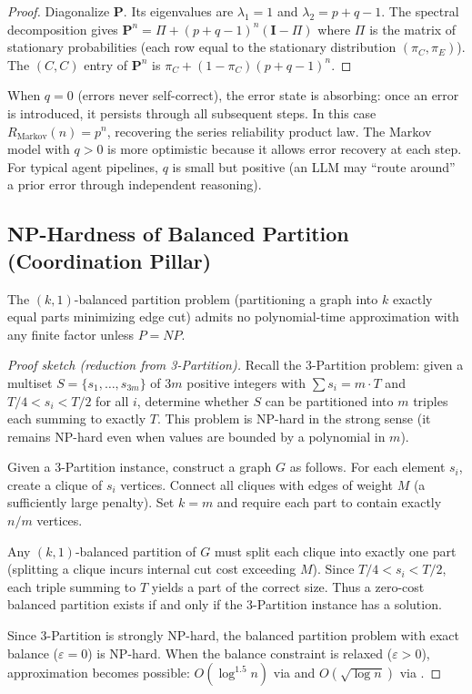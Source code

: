 \begin{proof}
Diagonalize $\mathbf{P}$. Its eigenvalues are $\lambda_1 = 1$ and
$\lambda_2 = p + q - 1$. The spectral decomposition gives
$\mathbf{P}^n = \Pi + (p + q - 1)^n (\mathbf{I} - \Pi)$
where $\Pi$ is the matrix of stationary probabilities (each row equal
to the stationary distribution $(\pi_C, \pi_E)$).
The $(C, C)$ entry of $\mathbf{P}^n$ is
$\pi_C + (1 - \pi_C)(p + q - 1)^n$.
\end{proof}

\begin{remark}
When $q = 0$ (errors never self-correct), the error state is absorbing:
once an error is introduced, it persists through all subsequent steps.
In this case $R_{\mathrm{Markov}}(n) = p^n$, recovering the series reliability
product law. The Markov model with $q > 0$ is more optimistic because it
allows error recovery at each step. For typical agent pipelines, $q$ is small
but positive (an LLM may ``route around'' a prior error through independent reasoning).
\end{remark}


\subsection{NP-Hardness of Balanced Partition (Coordination Pillar)}

\begin{theorem}
The $(k, 1)$-balanced partition problem (partitioning a graph into $k$ exactly
equal parts minimizing edge cut) admits no polynomial-time approximation with
any finite factor unless $P = NP$.
\end{theorem}

\begin{proof}[Proof sketch (reduction from 3-Partition)]
Recall the 3-Partition problem: given a multiset $S = \{s_1, \ldots, s_{3m}\}$
of $3m$ positive integers with $\sum s_i = m \cdot T$ and $T/4 < s_i < T/2$
for all $i$, determine whether $S$ can be partitioned into $m$ triples each
summing to exactly $T$. This problem is NP-hard in the strong sense
(it remains NP-hard even when values are bounded by a polynomial in $m$).

Given a 3-Partition instance, construct a graph $G$ as follows.
For each element $s_i$, create a clique of $s_i$ vertices.
Connect all cliques with edges of weight $M$ (a sufficiently large penalty).
Set $k = m$ and require each part to contain exactly $n/m$ vertices.

Any $(k, 1)$-balanced partition of $G$ must split each clique into exactly
one part (splitting a clique incurs internal cut cost exceeding $M$).
Since $T/4 < s_i < T/2$, each triple summing to $T$ yields a part of the
correct size. Thus a zero-cost balanced partition exists if and only if
the 3-Partition instance has a solution.

Since 3-Partition is strongly NP-hard, the balanced partition problem
with exact balance ($\varepsilon = 0$) is NP-hard. When the balance constraint
is relaxed ($\varepsilon > 0$), approximation becomes possible:
$O(\log^{1.5} n)$ via \citet{AndreevRacke2006} and
$O(\sqrt{\log n})$ via \citet{AroraRaoVazirani2009}.
\end{proof}


